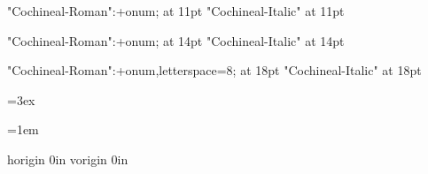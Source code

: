 



\font\elevenrm "Cochineal-Roman":+onum; at 11pt\relax
\font\elevenit "Cochineal-Italic" at 11pt\relax

\font\fourteenrm "Cochineal-Roman":+onum; at 14pt\relax
\font\fourteenit "Cochineal-Italic" at 14pt\relax

\font\eighteenrm "Cochineal-Roman":+onum,letterspace=8; at 18pt\relax
\font\eighteenit "Cochineal-Italic" at 18pt\relax


\def\normalsize{%
	\gdef\rm{\elevenrm}%
	\gdef\it{\elevenit}%
}

\def\chaptersize{%
	\gdef\rm{\fourteenrm}%
	\gdef\it{\fourteenit}%
}

\def\titlesize{%
	\gdef\rm{\eighteenrm}%
	\gdef\it{\eighteenit}%
}

\let\emph\it

\normalsize\rm


\baselineskip=3ex

\frenchspacing

\parskip=0pt

\parindent=1em

\emergencystretch=10pt

\def\firstnoindent{\global\everypar={\wipeeverypar\setbox7=\lastbox}}
\def\wipeeverypar{\global\everypar={}}

{}



\pagewidth=148mm	
\pageheight=210mm

\pdfvariable horigin 0in	
\pdfvariable vorigin 0in


